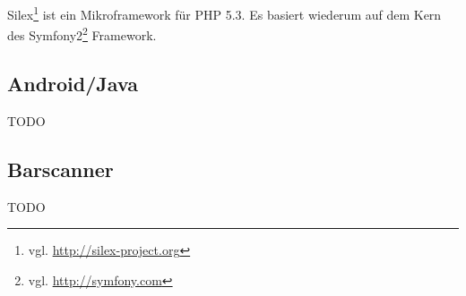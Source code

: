 Silex\footnote{vgl. \url{http://silex-project.org}} ist ein Mikroframework für PHP 5.3. Es basiert wiederum auf dem Kern des Symfony2\footnote{vgl. \url{http://symfony.com}} Framework.

\subsection{Android/Java}

TODO

\subsection{Barscanner}

TODO